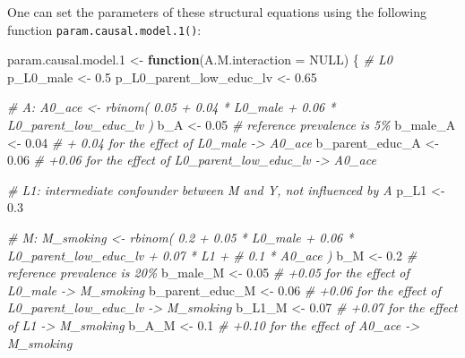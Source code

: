 \documentclass[
]{book}
\newenvironment{Shaded}{\begin{snugshade}}{\end{snugshade}}
\newcommand{\AttributeTok}[1]{\textcolor[rgb]{0.77,0.63,0.00}{#1}}
\newcommand{\CommentTok}[1]{\textcolor[rgb]{0.56,0.35,0.01}{\textit{#1}}}
\newcommand{\ConstantTok}[1]{\textcolor[rgb]{0.00,0.00,0.00}{#1}}
\newcommand{\ControlFlowTok}[1]{\textcolor[rgb]{0.13,0.29,0.53}{\textbf{#1}}}
\newcommand{\FloatTok}[1]{\textcolor[rgb]{0.00,0.00,0.81}{#1}}
\newcommand{\NormalTok}[1]{#1}
\newcommand{\OtherTok}[1]{\textcolor[rgb]{0.56,0.35,0.01}{#1}}
\begin{document}
One can set the parameters of these structural equations using the following function \texttt{param.causal.model.1()}:

\begin{Shaded}
\begin{Highlighting}[]
\NormalTok{param.causal.model}\FloatTok{.1} \OtherTok{\textless{}{-}} \ControlFlowTok{function}\NormalTok{(}\AttributeTok{A.M.interaction =} \ConstantTok{NULL}\NormalTok{) \{}
\CommentTok{\# L0}
\NormalTok{p\_L0\_male }\OtherTok{\textless{}{-}} \FloatTok{0.5}
\NormalTok{p\_L0\_parent\_low\_educ\_lv }\OtherTok{\textless{}{-}} \FloatTok{0.65}

\CommentTok{\# A: A0\_ace \textless{}{-} rbinom( 0.05 + 0.04 * L0\_male + 0.06 * L0\_parent\_low\_educ\_lv ) }
\NormalTok{b\_A }\OtherTok{\textless{}{-}} \FloatTok{0.05}   \CommentTok{\# reference prevalence is 5\%}
\NormalTok{b\_male\_A }\OtherTok{\textless{}{-}} \FloatTok{0.04}  \CommentTok{\# + 0.04 for the effect of L0\_male {-}\textgreater{} A0\_ace}
\NormalTok{b\_parent\_educ\_A }\OtherTok{\textless{}{-}} \FloatTok{0.06}  \CommentTok{\# +0.06 for the effect of L0\_parent\_low\_educ\_lv {-}\textgreater{} A0\_ace}

\CommentTok{\# L1: intermediate confounder between M and Y, not influenced by A}
\NormalTok{p\_L1 }\OtherTok{\textless{}{-}} \FloatTok{0.3}

\CommentTok{\# M: M\_smoking \textless{}{-} rbinom( 0.2 + 0.05 * L0\_male + 0.06 * L0\_parent\_low\_educ\_lv + 0.07 * L1 +}
\CommentTok{\#                         0.1 * A0\_ace ) }
\NormalTok{b\_M }\OtherTok{\textless{}{-}} \FloatTok{0.2} \CommentTok{\# reference prevalence is 20\%}
\NormalTok{b\_male\_M }\OtherTok{\textless{}{-}} \FloatTok{0.05} \CommentTok{\# +0.05 for the effect of L0\_male {-}\textgreater{} M\_smoking}
\NormalTok{b\_parent\_educ\_M }\OtherTok{\textless{}{-}} \FloatTok{0.06} \CommentTok{\# +0.06 for the effect of L0\_parent\_low\_educ\_lv {-}\textgreater{} M\_smoking}
\NormalTok{b\_L1\_M }\OtherTok{\textless{}{-}} \FloatTok{0.07} \CommentTok{\# +0.07 for the effect of L1 {-}\textgreater{} M\_smoking}
\NormalTok{b\_A\_M }\OtherTok{\textless{}{-}} \FloatTok{0.1} \CommentTok{\# +0.10 for the effect of A0\_ace {-}\textgreater{} M\_smoking}


\end{Highlighting}
\end{Shaded}
\end{document}
